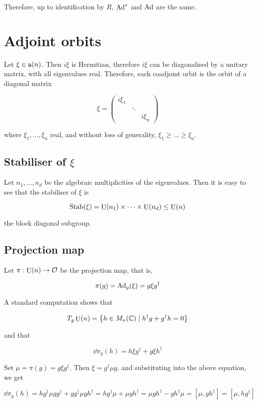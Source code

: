\documentclass{article}
\DeclareMathOperator{\U}{U}
\renewcommand{\u}{\mfu}
\begin{document}
Therefore, up to identification by \(R\), \(\operatorname{Ad}^*\) and \(\operatorname{Ad}\) are the same.

\section{Adjoint orbits}

Let \(\xi \in \u(n)\). Then \(i\xi\) is Hermitian, therefore \(i\xi\) can be diagonalised by a unitary matrix, with all eigenvalues real. Therefore, each coadjoint orbit is the orbit of a diagonal matrix

\[\xi = \begin{pmatrix}
    i\xi_1 \\
    & \ddots \\
    && i\xi_n
\end{pmatrix}\]

where \(\xi_1, \dots, \xi_n\) real, and without loss of generality, \(\xi_1 \geq \dots \geq \xi_n\).

\subsection{Stabiliser of \(\xi\)}

Let \(n_1, \dots, n_d\) be the algebraic multiplicities of the eigenvalues. Then it is easy to see that the stabiliser of \(\xi\) is

\[\Stab(\xi) = \U(n_1) \times \cdots \times \U(n_d) \le \U(n)\]

the block diagonal subgroup.

\subsection{Projection map}

Let \(\pi : \U(n) \to \mcO\) be the projection map, that is,

\[\pi(g) = \operatorname{Ad}_g(\xi) = g\xi g^\dagger\]

A standard computation shows that

\[T_g\U(n) = \left\{h \in M_n(\C) \mid h^\dagger g + g^\dagger h = 0\right\}\]

and that

\[\dd\pi_g(h) = h\xi g^\dagger + g\xi h^\dagger\]

Set \(\mu = \pi(g) = g \xi g^\dagger\). Then \(\xi = g^\dagger \mu g\), and substituting into the above equation, we get

\[\dd\pi_g(h) = hg^\dagger\mu g g^\dagger + g g^\dagger \mu g h^\dagger = hg^\dagger\mu + \mu gh^\dagger = \mu gh^\dagger - gh^\dagger\mu = [\mu, gh^\dagger]= [\mu, hg^\dagger]\]
\end{document}
